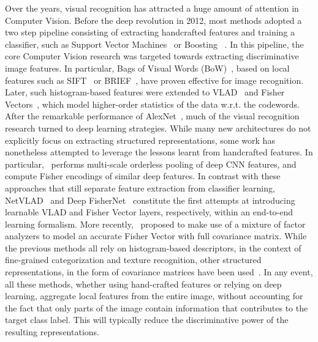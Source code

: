 \documentclass{bmvc2k}
\begin{document}
Over the years, visual recognition has attracted a huge amount of attention in Computer Vision. Before the deep revolution in 2012, most methods adopted a two step pipeline consisting of extracting handcrafted features and training a classifier, such as Support Vector Machines~\cite{svm1998} or Boosting ~\cite{boosting1996}. In this pipeline, the core Computer Vision research was targeted towards extracting discriminative image features. In particular, Bags of Visual Words (BoW)~\cite{BoW1,BoW2,bow3},  based on local features such as SIFT~\cite{sift} or BRIEF~\cite{brief}, have proven effective for image recognition. Later, such histogram-based features were extended to VLAD~\cite{vlad} and Fisher Vectors~\cite{fisher2010,fisher2013}, which model higher-order statistics of the data w.r.t. the codewords. After the remarkable performance of AlexNet~\cite{Alexnet}, much of the visual recognition research turned to deep learning strategies. While many new architectures do not explicitly focus on extracting structured representations, some work has nonetheless attempted to leverage the lessons learnt from handcrafted features. In particular,~\cite{vladmultiscale} performs multi-scale orderless pooling of deep CNN features, and~\cite{semanticFV,FVFC} compute Fisher encodings of similar deep features. In contrast with these approaches that still separate feature extraction from classifier learning, NetVLAD~\cite{netvlad} and Deep FisherNet~\cite{deepfishernet} constitute the first attempts at introducing learnable VLAD and Fisher Vector layers, respectively, within an end-to-end learning formalism. More recently,~\cite{mfafvnet} proposed to make use of a mixture of factor analyzers to model an accurate Fisher Vector with full covariance matrix. While the previous methods all rely on histogram-based descriptors, in the context of fine-grained categorization and texture recognition, other structured representations, in the form of covariance matrices have been used~\cite{bcnn,Secondorderkaicheng2018,improvedbcnn}. In any event, all these methods, whether using hand-crafted features or relying on deep learning, aggregate local features from the entire image, without accounting for the fact that only parts of the image contain information that contributes to the target class label. This will typically reduce the discriminative power of the resulting representations.
\end{document}
